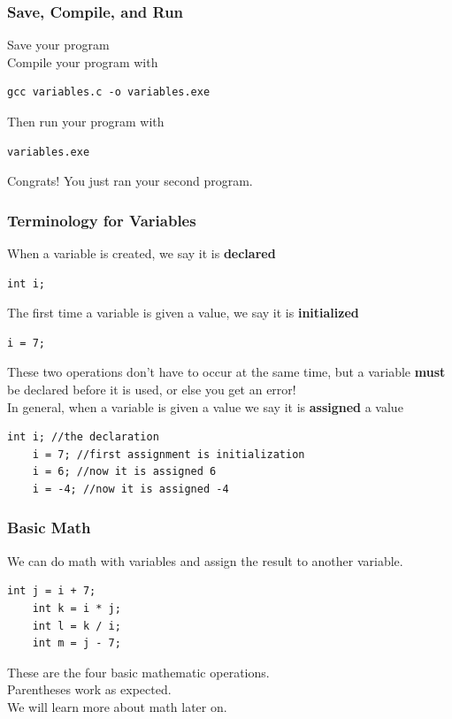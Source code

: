 \documentclass{beamer}
\begin{document}
\begin{frame}[fragile]
  \frametitle{Save, Compile, and Run}
  Save your program\\
  \vspace{12pt}
  Compile your program with 
  \begin{lstlisting}[style=custombash]
    gcc variables.c -o variables.exe
  \end{lstlisting}
  Then run your program with
  \begin{lstlisting}[style=custombash]
    variables.exe
  \end{lstlisting}
  \vspace{12pt}
  Congrats! You just ran your second program.
\end{frame}

\begin{frame}[fragile]
  \frametitle{Terminology for Variables}
  When a variable is created, we say it is \textbf{declared}
  \begin{lstlisting}[style=customc]
    int i;
  \end{lstlisting}
  The first time a variable is given a value, we say it is \textbf{initialized}
  \begin{lstlisting}[style=customc]
    i = 7;
  \end{lstlisting}
  These two operations don't have to occur at the same time, but a variable \textbf{must}
  be declared before it is used, or else you get an error!\\
  In general, when a variable is given a value we say it is \textbf{assigned} a value
  \begin{lstlisting}[style=customc]
    int i; //the declaration
    i = 7; //first assignment is initialization
    i = 6; //now it is assigned 6
    i = -4; //now it is assigned -4
  \end{lstlisting}
\end{frame}

\begin{frame}[fragile]
  \frametitle{Basic Math}
  We can do math with variables and assign the result to another variable.
  \begin{lstlisting}[style=customc]
    int j = i + 7;
    int k = i * j;
    int l = k / i;
    int m = j - 7;
  \end{lstlisting}
  These are the four basic mathematic operations.\\
  Parentheses work as expected.\\
  We will learn more about math later on.
\end{frame}
\end{document}
